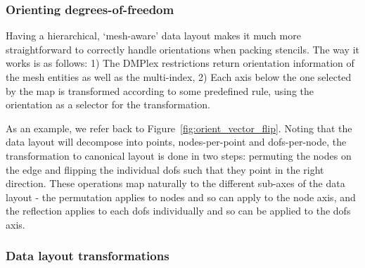 \subsubsection{Orienting degrees-of-freedom}
\label{sec:impl_orientation}

Having a hierarchical, `mesh-aware' data layout makes it much more straightforward to correctly handle orientations when packing stencils.
The way it works is as follows:
1) The DMPlex restrictions return orientation information of the mesh entities as well as the multi-index,
2) Each axis below the one selected by the map is transformed according to some predefined rule, using the orientation as a selector for the transformation.

As an example, we refer back to Figure~\ref{fig:orient_vector_flip}.
Noting that the data layout will decompose into points, nodes-per-point and \glspl{dof}-per-node, the transformation to canonical layout is done in two steps: permuting the nodes on the edge and flipping the individual \glspl{dof} such that they point in the right direction.
These operations map naturally to the different sub-axes of the data layout - the permutation applies to nodes and so can apply to the node axis, and the reflection applies to each \glspl{dof} individually and so can be applied to the \glspl{dof} axis.

\subsubsection{Data layout transformations}
\label{sec:impl_datalayoutopt}

